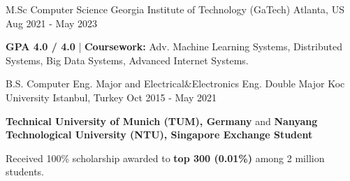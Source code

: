 \begin{cventries}
\vspace{2mm}
\cventry
    {M.Sc Computer Science}
    {Georgia Institute of Technology (GaTech)}
    {Atlanta, US}
    {Aug 2021 - May 2023}
    {
    \begin{cvghostitems}
      \item {\textbf{GPA 4.0 / 4.0} | \textbf{Coursework:} Adv. Machine Learning Systems, Distributed Systems, Big Data Systems, Advanced Internet Systems.}
    \end{cvghostitems}
    }
\cvopenentry
    {B.S. Computer Eng. Major and Electrical\&Electronics Eng. Double Major}
    {Koc University}
    {Istanbul, Turkey}
    {Oct 2015 - May 2021}
    {
    \begin{cvghostitems}
      \item {\textbf{Technical University of Munich (TUM), Germany} and \textbf{Nanyang Technological University (NTU), Singapore Exchange Student}}
      \item {Received 100\% scholarship awarded to \textbf{top 300 (0.01\%)} among 2 million students.}
    \end{cvghostitems}
    }
\end{cventries}
